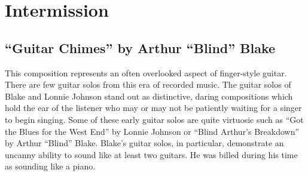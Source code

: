 \documentclass{tufte-handout}
\begin{document}
\section*{Intermission}







\subsection*{``Guitar Chimes'' by Arthur ``Blind'' Blake}
This composition represents an often overlooked aspect of finger-style
guitar. There are few guitar solos from this era of recorded music. The guitar solos of Blake and Lonnie Johnson stand out as distinctive, daring compositions which hold the ear of the listener who may or may not be patiently waiting for a singer to begin singing. Some of these early guitar solos are quite virtuosic such as ``Got the Blues for the West End'' by Lonnie Johnson or ``Blind Arthur's Breakdown'' by Arthur ``Blind'' Blake. Blake's guitar solos, in particular, demonstrate an uncanny ability to sound like at least two guitars. He was billed during his time as sounding like a piano.
\end{document}
